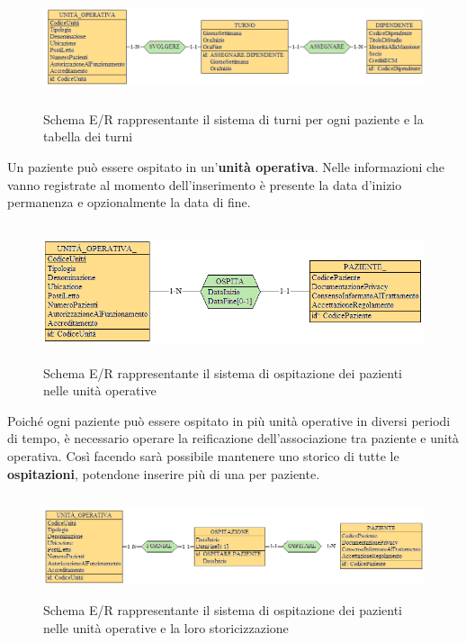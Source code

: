 \documentclass[a4paper, 12pt]{report}
\begin{document}
\begin{figure}[H]
        \centering
        \includegraphics[height=3.5cm]{img/dipendenteTurniPostReif.png}
        \caption{Schema E/R rappresentante il sistema di turni per ogni paziente e la tabella dei turni}
\end{figure}

\noindent
Un paziente può essere ospitato in un'\textbf{unità operativa}. Nelle informazioni che vanno registrate al momento dell'inserimento è presente
la data d'inizio permanenza e opzionalmente la data di fine.

\begin{figure}[H]
        \centering
        \includegraphics[height=4cm]{img/pazienteOspitazionePreReif.png}
        \caption{Schema E/R rappresentante il sistema di ospitazione dei pazienti nelle unità operative}
\end{figure}

\noindent
Poiché ogni paziente può essere ospitato in più unità operative in diversi periodi di tempo, è necessario operare la reificazione
dell'associazione tra paziente e unità operativa. Così facendo sarà possibile mantenere uno storico di tutte le \textbf{ospitazioni},
potendone inserire più di una per paziente.

\begin{figure}[H]
        \centering
        \includegraphics[height=3cm]{img/pazienteOspitazionePostReif.png}
        \caption{Schema E/R rappresentante il sistema di ospitazione dei pazienti nelle unità operative e la loro storicizzazione}
\end{figure}
\end{document}

